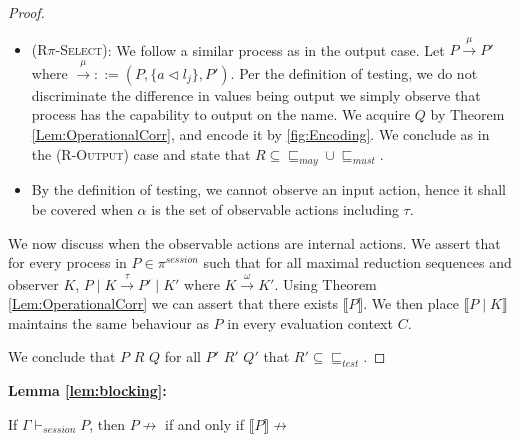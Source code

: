 \begin{proof}
\begin{itemize}
    \item \textsc{(R$\pi$-Select)}: We follow a similar process as in the output case. Let $P \xrightarrow{\mu} P'$ where $\xrightarrow{\mu} ::= (P, \{a \vartriangleleft l_j \}, P')$. Per the definition of testing, we do not discriminate the difference in values being output we simply observe that process has the capability to output on the name. We acquire $Q$ by Theorem \ref{Lem:OperationalCorr}, and encode it by \autoref{fig:Encoding}. We conclude as in the \textsc{(R-Output)} case and state that $R \subseteq \sqsubseteq_{may} \cup \sqsubseteq_{must}$.
    
    \item By the definition of testing, we cannot observe an input action, hence it shall be covered when $\alpha$ is the set of observable actions including $\tau$.
\end{itemize}

We now discuss when the observable actions are internal actions. We assert that for every process in $P \in \pi^{session}$ such that for all maximal reduction sequences and observer $K$, $P \mid K \xrightarrow{\tau} P' \mid K'$ where $K \xrightarrow{\omega} K'$. Using Theorem \ref{Lem:OperationalCorr} we can assert that there exists $\llbracket P \rrbracket$. We then place $\llbracket P \mid K \rrbracket$ maintains the same behaviour as $P$ in every evaluation context $C$.

We conclude that $P$ $R$ $Q$ for all $P'$ $R'$ $Q'$ that $R' \subseteq \sqsubseteq_{test}$.
\end{proof}

\vspace{10pt}


\textbf{Lemma \ref{lem:blocking}:}

If $\Gamma \vdash_{session} P$, then $P \not \rightarrow$ if and only if $\llbracket P \rrbracket \not \rightarrow$

